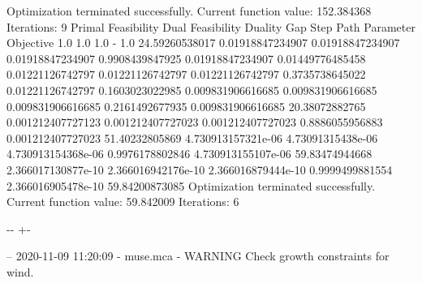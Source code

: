 \documentclass[letterpaper,10pt,english]{sphinxmanual}
\newlength\nbsphinxcodecellspacing
\begin{document}
{\begin{sphinxVerbatim}[commandchars=\\\{\}]
Optimization terminated successfully.
         Current function value: 152.384368
         Iterations: 9
Primal Feasibility  Dual Feasibility    Duality Gap         Step             Path Parameter      Objective
1.0                 1.0                 1.0                 -                1.0                 24.59260538017
0.01918847234907    0.01918847234907    0.01918847234907    0.9908439847925  0.01918847234907    0.01449776485458
0.01221126742797    0.01221126742797    0.01221126742797    0.3735738645022  0.01221126742797    0.1603023022985
0.009831906616685   0.009831906616685   0.009831906616685   0.2161492677935  0.009831906616685   20.38072882765
0.001212407727123   0.001212407727023   0.001212407727023   0.8886055956883  0.001212407727023   51.40232805869
4.730913157321e-06  4.73091315438e-06   4.730913154368e-06  0.9976178802846  4.730913155107e-06  59.83474944668
2.366017130877e-10  2.366016942176e-10  2.366016879444e-10  0.9999499881554  2.366016905478e-10  59.84200873085
Optimization terminated successfully.
         Current function value: 59.842009
         Iterations: 6
\end{sphinxVerbatim}
}

{

\kern-\sphinxverbatimsmallskipamount\kern-\baselineskip
\kern+\FrameHeightAdjust\kern-\fboxrule
\vspace{\nbsphinxcodecellspacing}

\begin{sphinxVerbatim}[commandchars=\\\{\}]
-- 2020-11-09 11:20:09 - muse.mca - WARNING
Check growth constraints for wind.

\end{sphinxVerbatim}
}
\end{document}

